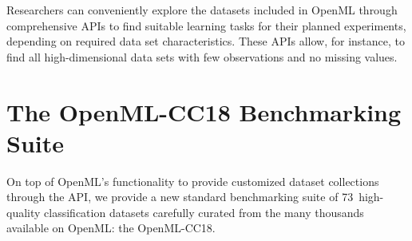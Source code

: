 \documentclass[twoside,11pt]{article}
\newcommand{\numdatasets}{73}
\begin{document}
Researchers can conveniently explore the datasets included in OpenML through comprehensive APIs to find suitable learning tasks for their planned experiments, depending on required data set characteristics. These APIs allow, for instance, to find all high-dimensional data sets with few observations and no missing values.


\section{The OpenML-CC18 Benchmarking Suite}

On top of OpenML's 
functionality to provide customized dataset collections through the API, we provide a new standard benchmarking
suite of \numdatasets~high-quality classification datasets carefully curated from the many thousands available on OpenML: the OpenML-CC18.
\end{document}
